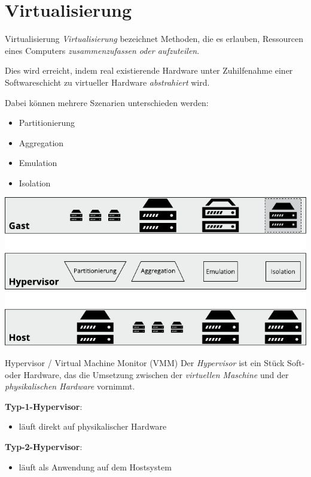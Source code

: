 \section{Virtualisierung}

\begin{defi}{Virtualisierung}
    \emph{Virtualisierung} bezeichnet Methoden, die es erlauben, Ressourcen
    eines Computers \emph{zusammenzufassen oder aufzuteilen}.

    Dies wird erreicht, indem real existierende Hardware unter
    Zuhilfenahme einer Softwareschicht zu virtueller Hardware \emph{abstrahiert} wird.

    Dabei können mehrere Szenarien unterschieden werden:
    \begin{itemize}
        \item Partitionierung
        \item Aggregation
        \item Emulation
        \item Isolation
    \end{itemize}
    \vspace{1em}
    \begin{center}
        \includegraphics[]{images/virtualisierung.pdf}
    \end{center}
\end{defi}

\begin{defi}{Hypervisor / Virtual Machine Monitor (VMM)}
    Der \emph{Hypervisor} ist ein Stück Soft- oder Hardware, das  die Umsetzung
    zwischen der \emph{virtuellen Maschine} und der \emph{physikalischen Hardware} vornimmt.

    \textbf{Typ-1-Hypervisor}:
    \begin{itemize}
        \item läuft direkt auf physikalischer Hardware
    \end{itemize}

    \textbf{Typ-2-Hypervisor}:
    \begin{itemize}
        \item läuft als Anwendung auf dem Hostsystem
    \end{itemize}
\end{defi}

